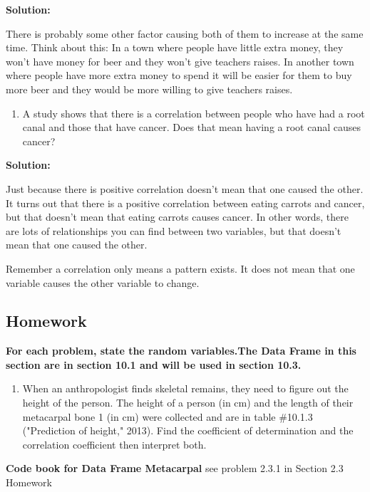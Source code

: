 \documentclass[]{book}
\providecommand{\tightlist}{%
  \setlength{\itemsep}{0pt}\setlength{\parskip}{0pt}}
\begin{document}
\textbf{Solution:}

There is probably some other factor causing both of them to increase at the same time. Think about this: In a town where people have little extra money, they won't have money for beer and they won't give teachers raises. In another town where people have more extra money to spend it will be easier for them to buy more beer and they would be more willing to give teachers raises.

\begin{enumerate}
\def\labelenumi{\alph{enumi}.}
\setcounter{enumi}{1}
\tightlist
\item
  A study shows that there is a correlation between people who have had a root canal and those that have cancer. Does that mean having a root canal causes cancer?
\end{enumerate}

\textbf{Solution:}

Just because there is positive correlation doesn't mean that one caused the other. It turns out that there is a positive correlation between eating carrots and cancer, but that doesn't mean that eating carrots causes cancer. In other words, there are lots of relationships you can find between two variables, but that doesn't mean that one caused the other.

Remember a correlation only means a pattern exists. It does not mean that one variable causes the other variable to change.

\hypertarget{homework-30}{%
\subsection{Homework}\label{homework-30}}

\textbf{For each problem, state the random variables.The Data Frame in this section are in section 10.1 and will be used in section 10.3.}

\begin{enumerate}
\def\labelenumi{\arabic{enumi}.}
\tightlist
\item
  When an anthropologist finds skeletal remains, they need to figure out the height of the person. The height of a person (in cm) and the length of their metacarpal bone 1 (in cm) were collected and are in table \#10.1.3 ("Prediction of height," 2013). Find the coefficient of determination and the correlation coefficient then interpret both.
\end{enumerate}

\textbf{Code book for Data Frame Metacarpal} see problem 2.3.1 in Section 2.3 Homework
\end{document}
